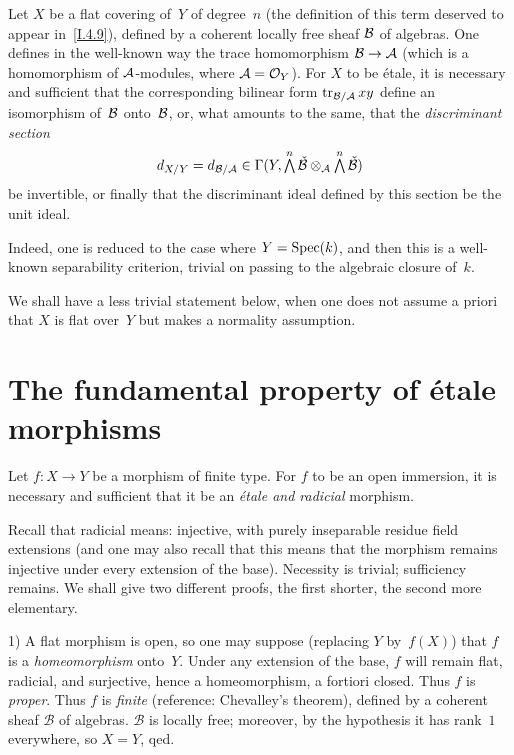 \begin{proposition}
\label{I.4.10}
Let $X$ be a flat covering of~$Y$ of degree~$n$ (the definition
of this term deserved to appear in~\ref{I.4.9}), defined by a
coherent locally free sheaf $\cal{B}$ of algebras. One defines
in the well-known way the trace homomorphism $\cal{B}\to\cal{A}$
(which is a homomorphism of $\cal{A}$-modules, where
$\cal{A}=\cal{O}_Y$). For $X$ to be \'etale, it is necessary
and sufficient that the corresponding bilinear form
$\trace_{\cal{B}/\cal{A}}xy$ define an isomorphism of~$\cal{B}$
onto~$\cal{B}$, or, what amounts to the same, that the
\emph{discriminant section}
\[
d_{X/Y} = d_{\cal{B}/\cal{A}} \in
\Gamma(Y,\tbigwedge^n\check{\cal{B}}\otimes_{\cal{A}}
\tbigwedge^n\check{\cal{B}})
\]
be invertible, or finally that the discriminant ideal defined by
this section be the unit ideal.
\end{proposition}

Indeed, one is reduced to the case where $Y=\Spec(k)$, and then
this is a well-known separability criterion, trivial on passing
to the algebraic closure of~$k$.

\begin{remark}
We
shall have a less trivial statement below, when one does not
assume a priori that $X$ is flat over~$Y$ but makes a normality
assumption.
\end{remark}

\section{The fundamental property of \'etale morphisms}
\label{I.5}

\begin{theorem}
\label{I.5.1}
Let $f\colon X\to Y$ be a morphism of finite type. For $f$ to be
an open immersion, it is necessary and sufficient that it be
an \emph{\'etale and radicial} morphism.
\end{theorem}

Recall that radicial means: injective, with purely inseparable
residue field extensions (and one may also recall that this means
that the morphism remains injective under every extension of the
base). Necessity is trivial; sufficiency remains. We shall give
two different proofs, the first shorter, the second more elementary.

1) A flat morphism is open, so one may suppose (replacing $Y$
by~$f(X)$) that $f$ is a \emph{homeomorphism} onto~$Y$.
Under any extension of the base, $f$ will remain flat, radicial,
and surjective, hence a homeomorphism, a fortiori closed.
Thus $f$ is \emph{proper}. Thus $f$ is \emph{finite}
(reference: Chevalley's theorem), defined by a coherent sheaf
$\mathcal{B}$ of algebras. $\mathcal{B}$ is locally free;
moreover, by the hypothesis it has rank~$1$ everywhere, so
$X=Y$, qed.

